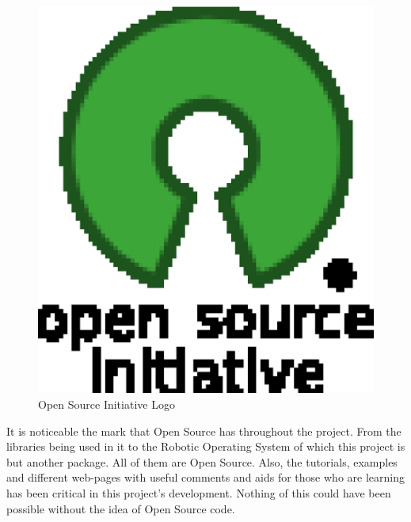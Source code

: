 \begin{figure}[h]
	\begin{center}
    \includegraphics[scale=0.2]{img/intro/open_source.eps}
	\caption[Open Source Initiative Logo]{Open Source Initiative Logo}
	\end{center}
\end{figure}


It is noticeable the mark that Open Source has throughout the project. From the libraries being used in it to the Robotic Operating System of which this project is but another package. All of them are Open Source. Also, the tutorials, examples and different web-pages with useful comments and aids for those who are learning has been critical in this project's development. Nothing of this could have been possible without the idea of Open Source code. 
\\

\\



